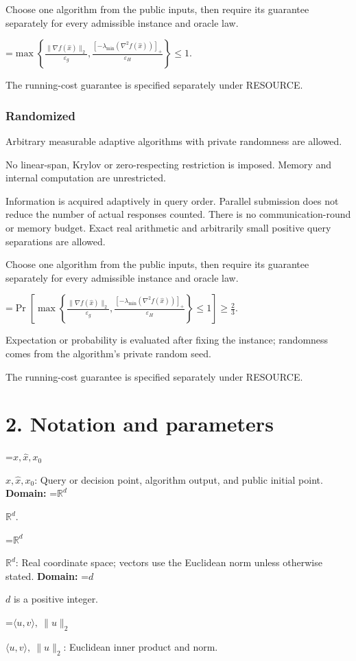 \documentclass[10pt,a4paper]{article}
\newcommand{\AtlasMath}[1]{\par\begingroup\centering\setbox0=\hbox{$\displaystyle #1$}\ifdim\wd0>1.4\linewidth\typeout{ATLAS WIDE FORMULA: \the\wd0}\fi\ifdim\wd0>\linewidth\resizebox{\linewidth}{!}{\box0}\else\box0\fi\par\endgroup}
\newcommand{\AtlasInlineMath}[1]{\begingroup\setbox0=\hbox{$#1$}\ifdim\wd0>.4\linewidth\endgroup\AtlasMath{#1}\else\endgroup$#1$\fi}
\begin{document}
Choose one algorithm from the public inputs, then require its guarantee separately for every admissible instance and oracle law.


\AtlasMath{\max\left\{\frac{\|\nabla f(\widehat{x})\|_2}{\varepsilon_g},\frac{[-\lambda_{\min}(\nabla^2f(\widehat{x}))]_+}{\varepsilon_H}\right\}\le 1.}


The running-cost guarantee is specified separately under RESOURCE.

\subsubsection{Randomized}
Arbitrary measurable adaptive algorithms with private randomness are allowed.

No linear-span, Krylov or zero-respecting restriction is imposed. Memory and internal computation are unrestricted.

Information is acquired adaptively in query order. Parallel submission does not reduce the number of actual responses counted. There is no communication-round or memory budget. Exact real arithmetic and arbitrarily small positive query separations are allowed.

Choose one algorithm from the public inputs, then require its guarantee separately for every admissible instance and oracle law.


\AtlasMath{\Pr\!\left[\max\left\{\frac{\|\nabla f(\widehat{x})\|_2}{\varepsilon_g},\frac{[-\lambda_{\min}(\nabla^2f(\widehat{x}))]_+}{\varepsilon_H}\right\}\le 1\right]\ge\frac23.}


Expectation or probability is evaluated after fixing the instance; randomness comes from the algorithm's private random seed.

The running-cost guarantee is specified separately under RESOURCE.

\section{2. Notation and parameters}
\AtlasInlineMath{x,\widehat{x},x_0}: Query or decision point, algorithm output, and public initial point. \textbf{Domain:} \AtlasInlineMath{\mathbb{R}^d}.

\AtlasInlineMath{\mathbb{R}^d}: Real coordinate space; vectors use the Euclidean norm unless otherwise stated. \textbf{Domain:} \AtlasInlineMath{d} is a positive integer.

\AtlasInlineMath{\langle u,v\rangle,\ \|u\|_2}: Euclidean inner product and norm.
\end{document}
